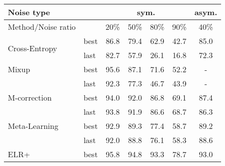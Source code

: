 \documentclass[letterpaper]{article} \usepackage{aaai22}  \usepackage{times}  \usepackage{helvet}  \usepackage{courier}  \usepackage[hyphens]{url}  \usepackage{graphicx} \urlstyle{rm} \def\UrlFont{\rm}  \usepackage{natbib}  \usepackage{caption} \DeclareCaptionStyle{ruled}{labelfont=normalfont,labelsep=colon,strut=off} \frenchspacing  \setlength{\pdfpagewidth}{8.5in}  \setlength{\pdfpageheight}{11in}  \usepackage{algorithm}
\begin{document}
\begin{table}[]
\begin{tabular}{@{}llccccc@{}}
\toprule
Noise type                               & \multicolumn{1}{l|}{}     & \multicolumn{4}{c|}{sym.}                                                          & \multicolumn{1}{l}{asym.} \\ \midrule
Method/Noise ratio                       & \multicolumn{1}{l|}{}     & 20\%          & 50\%          & 80\%          & \multicolumn{1}{c|}{90\%}          & 40\%                      \\ \midrule
\multirow{2}{*}{Cross-Entropy}           & \multicolumn{1}{l|}{best} & 86.8          & 79.4          & 62.9          & \multicolumn{1}{c|}{42.7}          & 85.0                      \\
                                         & \multicolumn{1}{l|}{last} & 82.7          & 57.9          & 26.1          & \multicolumn{1}{c|}{16.8}          & 72.3                      \\ \midrule
\multirow{1}{*}{Mixup}             & \multicolumn{1}{l|}{best} & 95.6          & 87.1          & 71.6          & \multicolumn{1}{c|}{52.2}          & -                         \\
\multirow{1}{*}{\cite{2018mixup}}                                         & \multicolumn{1}{l|}{last} & 92.3          & 77.3          & 46.7          & \multicolumn{1}{c|}{43.9}          & -                         \\ \midrule
\multirow{1}{*}{M-correction}      & \multicolumn{1}{l|}{best} & 94.0          & 92.0          & 86.8          & \multicolumn{1}{c|}{69.1}          & 87.4                      \\
\multirow{1}{*}{\cite{2019Unsupervised}}                                  & \multicolumn{1}{l|}{last} & 93.8          & 91.9          & 86.6          & \multicolumn{1}{c|}{68.7}          & 86.3                      \\ \midrule
\multirow{1}{*}{Meta-Learning}     & \multicolumn{1}{l|}{best} & 92.9          & 89.3          & 77.4          & \multicolumn{1}{c|}{58.7}          & 89.2                      \\
\multirow{1}{*}{\cite{2019Learning}}                                      & \multicolumn{1}{l|}{last} & 92.0          & 88.8          & 76.1          & \multicolumn{1}{c|}{58.3}          & 88.6                      \\ \midrule
\multirow{1}{*}{ELR+}              & \multicolumn{1}{l|}{best} & 95.8          & 94.8          & 93.3          & \multicolumn{1}{c|}{78.7}          & 93.0                      \\

\end{tabular}
\end{table}
\end{document}
